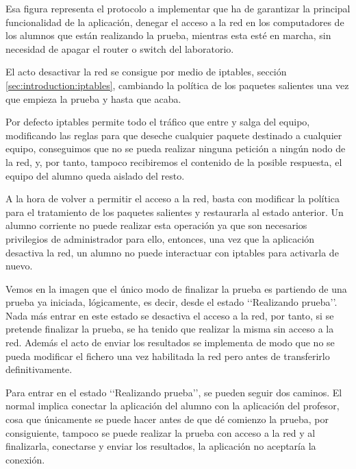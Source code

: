 Esa figura representa el protocolo a implementar que ha de garantizar la principal funcionalidad de la aplicación, denegar el acceso a la red en los computadores de los alumnos que están realizando la prueba, mientras esta esté en marcha, sin necesidad de apagar el router o switch del laboratorio.
\newline



El acto desactivar la red se consigue por medio de iptables, sección \ref{sec:introduction:iptables}, cambiando la política de los paquetes salientes una vez que empieza la prueba y hasta que acaba.
\newline

Por defecto iptables permite todo el tráfico que entre y salga del equipo, modificando las reglas para que deseche cualquier paquete destinado a cualquier equipo, conseguimos que no se pueda realizar ninguna petición a ningún nodo de la red, y, por tanto, tampoco recibiremos el contenido de la posible respuesta, el equipo del alumno queda aislado del resto.
\newline

A la hora de volver a permitir el acceso a la red, basta con modificar la política para el tratamiento de los paquetes salientes y restaurarla al estado anterior. Un alumno corriente no puede realizar esta operación ya que son necesarios privilegios de administrador para ello, entonces, una vez que la aplicación desactiva la red, un alumno no puede interactuar con iptables para activarla de nuevo.
\newline


Vemos en la imagen que el único modo de finalizar la prueba es partiendo de una prueba ya iniciada, lógicamente, es decir, desde el estado \lq\lq Realizando prueba\rq\rq. Nada más entrar en este estado se desactiva el acceso a la red, por tanto, si se pretende finalizar la prueba, se ha tenido que realizar la misma sin acceso a la red. Además el acto de enviar los resultados se implementa de modo que no se pueda modificar el fichero una vez habilitada la red pero antes de transferirlo definitivamente.
\newline

Para entrar en el estado \lq\lq Realizando prueba\rq\rq, se pueden seguir dos caminos. El normal implica conectar la aplicación del alumno con la aplicación del profesor, cosa que únicamente se puede hacer antes de que dé comienzo la prueba, por consiguiente, tampoco se puede realizar la prueba con acceso a la red y al finalizarla, conectarse y enviar los resultados, la aplicación no aceptaría la conexión.
\newline

